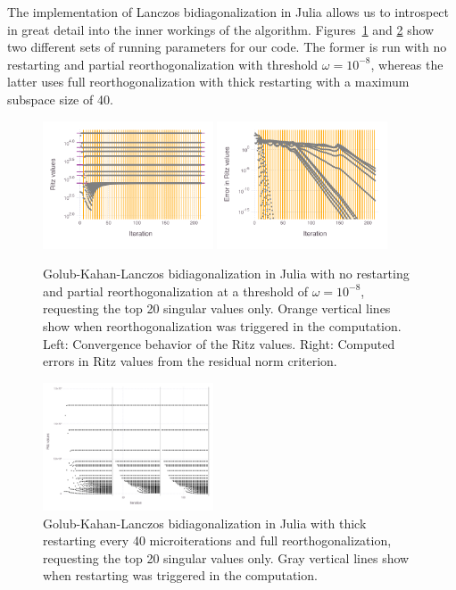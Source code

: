 \documentclass[review]{siamart0516}
\begin{document}
The implementation of Lanczos bidiagonalization in Julia allows us to introspect
in great detail into the inner workings of the algorithm.
Figures~\ref{fig:conv-lanczos-tsvd} and \ref{fig:lanczos-tr} show two different
sets of running parameters for our code. The former is run with no restarting
and partial reorthogonalization with threshold $\omega = 10^{-8}$, whereas the
latter uses full reorthogonalization with thick restarting with a maximum
subspace size of 40.

\begin{figure}
\caption{Golub-Kahan-Lanczos bidiagonalization in Julia with no restarting and
partial reorthogonalization at a threshold of $\omega = 10^{-8}$, requesting
the top 20 singular values only. Orange vertical lines show when reorthogonalization
was triggered in the computation.
Left: Convergence behavior of the Ritz values.
Right: Computed errors in Ritz values from the residual norm criterion.}
\label{fig:conv-lanczos-tsvd}
\includegraphics[width=0.45\textwidth]{fig/tsvdconv}
\includegraphics[width=0.45\textwidth]{fig/tsvderror}
\end{figure}

\begin{figure}
\caption{Golub-Kahan-Lanczos bidiagonalization in Julia with thick restarting
every 40 microiterations and full reorthogonalization,
requesting the top 20 singular values only.
Gray vertical lines show when restarting was triggered in the computation.
\label{fig:lanczos-tr}
}

\includegraphics[width=0.45\textwidth]{fig/thickrestarted/fig-conv}
\end{figure}
\end{document}
